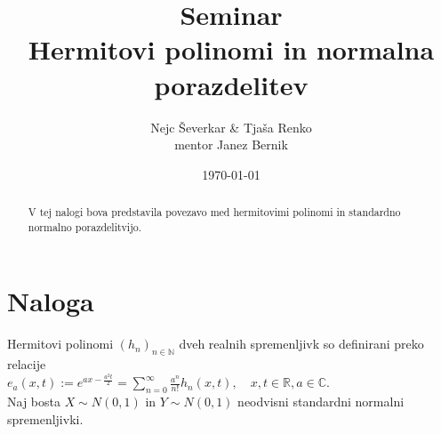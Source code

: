 \documentclass[ letterpaper, titlepage, fleqn]{article}
\begin{document}
\title{Seminar \\ Hermitovi polinomi in normalna porazdelitev}
\author{Nejc Ševerkar \& Tjaša Renko \\ mentor Janez Bernik}
\date{\today}
\maketitle

\begin{abstract}
\begin{center}
V tej nalogi bova predstavila povezavo med hermitovimi polinomi
in standardno normalno porazdelitvijo.
\end{center}
\end{abstract}

\section*{Naloga}
Hermitovi polinomi $(h_n)_{n \in \mathbb{N}}$ dveh realnih spremenljivk
so definirani preko relacije \\[10px]
$e_a(x, t) := e^{ax -\frac{a^2t}{2}} = \sum_{n=0}^{\infty} \frac{a^n}{n!} h_n(x, t), 
\quad x, t \in \mathbb{R}, a \in \mathbb{C}$.\\[10px]
Naj bosta $X \sim N(0, 1)$ in $Y \sim N(0, 1)$ neodvisni standardni normalni spremenljivki.
\end{document}
